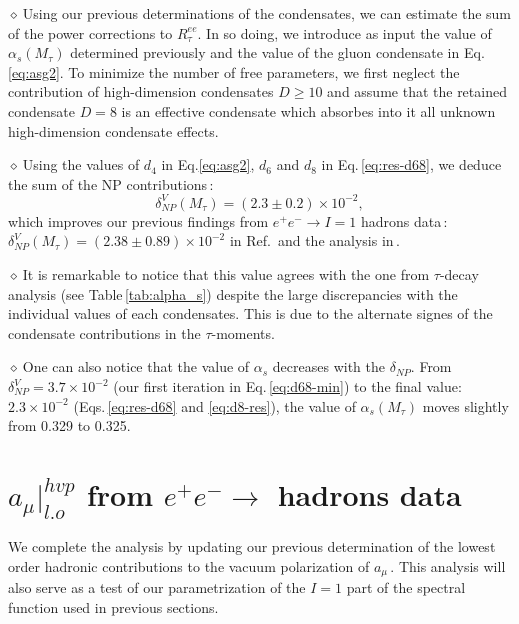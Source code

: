 \documentclass[review]{elsarticle}
\def\beq{\begin{equation}}
\def\eeq{\end{equation}}
\def\d{$\diamond~$}
\begin{document}
\d  Using our previous determinations of the condensates, we can estimate the sum of the power corrections to $R^{ee}_{\tau}$.
   In so doing, we introduce as input the value of $\alpha_s(M_\tau)$ determined previously and the value of the gluon condensate in Eq.\,\ref{eq:asg2}. To minimize the number of free parameters, we first neglect the contribution of high-dimension condensates $D\geq 10$ and assume that the retained condensate $D=8$ is an effective condensate which absorbes into it all unknown high-dimension condensate effects. 
   
 
\d  Using the values of $d_4$ in Eq.\ref{eq:asg2}, $d_6$ and $d_8$ in Eq.\,\ref{eq:res-d68}, we deduce the sum of the NP contributions\,:
\beq
\delta^V_{NP}(M_\tau)= (2.3\pm 0.2)\times 10^{-2},
\eeq
which improves our previous findings from $e^+e^-\to I=1$ hadrons data\,: $\delta^V_{NP}(M_\tau)= (2.38\pm 0.89)\times 10^{-2}$ in Ref.\,\cite{SN95} and the analysis in\,\cite{SNTAU}.  

\d It is remarkable to notice that this value agrees with the one from $\tau$-decay analysis (see Table\,\ref{tab:alpha_s}) despite the large discrepancies with the individual values of each condensates.  This is due to the alternate signes of the condensate contributions in the $\tau$-moments.

\d One can also notice that the value of $\alpha_s$ decreases with the $\delta_{NP}$.  From $\delta^V_{NP}=3.7\times 10^{-2}$  (our first iteration in Eq.\,\ref{eq:d68-min}) to the final value: $2.3 \times 10^{-2}$ (Eqs.\,\ref{eq:res-d68} and \ref{eq:d8-res}), the value of $\alpha_s(M_\tau)$ moves slightly  from 0.329 to 0.325. 

\section{$a_\mu\vert^{hvp}_{l.o}$ from   $e^+e^-\to$ hadrons data}
We complete the analysis by updating our previous determination of the  lowest order hadronic contributions  to the vacuum polarization of $a_\mu$\,\cite{SNamu}.  This analysis will also serve as a test of our parametrization of the $I=1$ part of the spectral function used in previous sections. 
\end{document}
